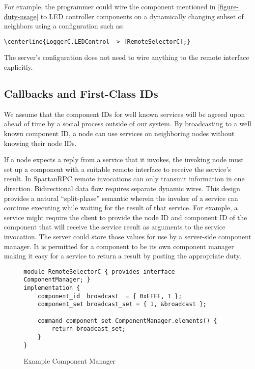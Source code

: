 For example, the programmer could wire the  component
mentioned in \autoref{figure-duty-usage} to LED controller components on
a dynamically changing subset of neighbors using a configuration such
as:
\begin{Verbatim}[commandchars=\\\{\}]
\centerline{LoggerC.LEDControl -> [RemoteSelectorC];}
\end{Verbatim}

The server's configuration does not need to wire anything to the remote
interface explicitly.

\subsection{Callbacks and First-Class IDs}

We assume that the component IDs for well known services will be agreed
upon ahead of time by a social process outside of our system. By
broadcasting to a well known component ID, a node can use services on
neighboring nodes without knowing their node IDs.

If a node expects a reply from a service that it invokes, the invoking
node must set up a component with a suitable remote interface to
receive the service's result. In SpartanRPC remote invocations can
only transmit information in one direction. Bidirectional data flow
requires separate dynamic wires. This design provides a natural
``split-phase'' semantic wherein the invoker of a service can continue
executing while waiting for the result of that service. For example, a
service might require the client to provide the node ID and component
ID of the component that will receive the service result as arguments
to the service invocation. The server could store those values for use
by a server-side component manager. It is permitted for a component to
be its own component manager making it easy for a service to return a
result by posting the appropriate duty.

\begin{figure}[!t]
\begin{textbox}{4.0in}
\begin{Verbatim}[fontsize=\small]
module RemoteSelectorC { provides interface ComponentManager; }
implementation {
    component_id  broadcast  = { 0xFFFF, 1 };
    component_set broadcast_set = { 1, &broadcast };

    command component_set ComponentManager.elements() {
        return broadcast_set;
    }
}
\end{Verbatim}
\end{textbox}
\caption{Example Component Manager}
\label{figure-example-componentmanager}
\end{figure}

